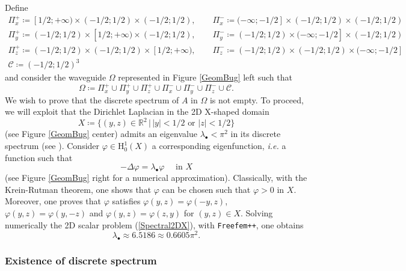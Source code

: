 \documentclass[11pt,a4paper]{article}
\newcommand{\Om}{\Omega}
\newcommand{\mrm}[1]{\mathrm{#1}}
\newcommand{\R}{\mathbb{R}}
\newcommand{\mH}{\mrm{H}}
\newcommand{\GX}{X}
\begin{document}
Define 
\[
\begin{array}{l}
\Pi^+_x\coloneqq[1/2;+\infty)\times(-1/2;1/2)\times(-1/2;1/2),\qquad \Pi^-_x\coloneqq(-\infty;-1/2]\times(-1/2;1/2)\times(-1/2;1/2)\\[2pt]
\Pi^+_y\coloneqq(-1/2;1/2)\times[1/2;+\infty)\times(-1/2;1/2),\qquad \Pi^-_y\coloneqq(-1/2;1/2)\times(-\infty;-1/2]\times(-1/2;1/2)\\[2pt]
\Pi^+_z\coloneqq(-1/2;1/2)\times(-1/2;1/2)\times[1/2;+\infty),\qquad \Pi^-_z\coloneqq(-1/2;1/2)\times(-1/2;1/2)\times(-\infty;-1/2]\\[2pt]
\mathcal{C}\coloneqq(-1/2;1/2)^3
\end{array}
\]
and consider the waveguide $\Om$ represented in Figure \ref{GeomBug} left such that
\[
\Om\coloneqq\Pi^+_x\cup\Pi^+_y\cup\Pi^+_z\cup\Pi^-_x\cup\Pi^-_y\cup\Pi^-_z\cup\mathcal{C}.
\]
We wish to prove that the discrete spectrum of $A$ in $\Om$ is not empty. To proceed, we will exploit that the Dirichlet Laplacian in the 2D X-shaped domain 
\[
\GX\coloneqq\{(y,z)\in\R^2\,|\,|y|<1/2\mbox{ or }|z|<1/2\}
\]
(see Figure \ref{GeomBug} center) admits an eigenvalue $\lambda_\bullet<\pi^2$ in its discrete spectrum (see \cite{ScRW89,Naza11,Naza14b}). Consider $\varphi\in\mH^1_0(\GX)$ a corresponding eigenfunction, \textit{i.e.} a function such that 
\begin{equation}\label{Spectral2DX}
-\Delta\varphi=\lambda_\bullet\varphi\quad\mbox{ in }\GX
\end{equation}
(see Figure \ref{GeomBug} right for a numerical approximation). Classically, with the Krein-Rutman theorem, one shows that $\varphi$ can be chosen such that $\varphi>0$ in $\GX$. Moreover, one proves that $\varphi$ satisfies $\varphi(y,z)=\varphi(-y,z)$, $\varphi(y,z)=\varphi(y,-z)$ and $\varphi(y,z)=\varphi(z,y)$ for $(y,z)\in \GX$. Solving numerically the 2D scalar problem (\ref{Spectral2DX}), with \texttt{Freefem++}, one obtains 
\begin{equation}\label{Vp2DX}
\lambda_\bullet\approx 6.5186 \approx 0.6605\pi^2.
\end{equation}

\subsubsection*{Existence of discrete spectrum}
\end{document}
